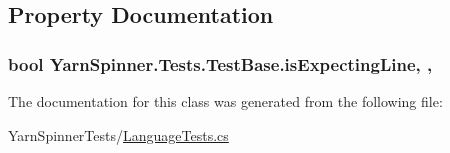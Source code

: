 \subsection{Property Documentation}
\hypertarget{a00146_a47f35b8e8123ed9471883d02b8bc9f3e}{
\subsubsection[{is\-Expecting\-Line}]{\setlength{\rightskip}{0pt plus 5cm}bool Yarn\-Spinner.\-Tests.\-Test\-Base.\-is\-Expecting\-Line\hspace{0.3cm}{\ttfamily [get]}, {\ttfamily [protected]}, {\ttfamily [inherited]}}}\label{a00146_a47f35b8e8123ed9471883d02b8bc9f3e}


The documentation for this class was generated from the following file\-:\begin{DoxyCompactItemize}
\item 
Yarn\-Spinner\-Tests/\hyperlink{a00279}{Language\-Tests.\-cs}\end{DoxyCompactItemize}
